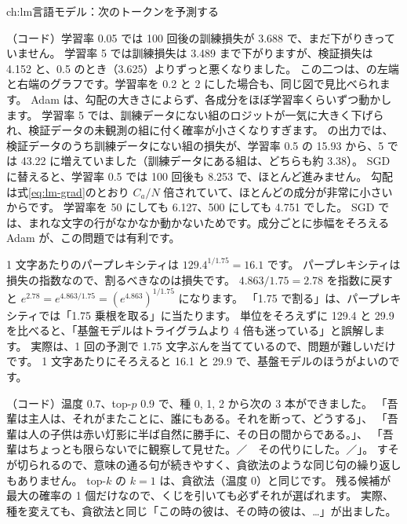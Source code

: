 \begin{answers}{ch:lm}{言語モデル：次のトークンを予測する}
\item （コード）学習率 0.05 では 100 回後の訓練損失が 3.688 で、まだ下がりきっていません。
学習率 5 では訓練損失は 3.489 まで下がりますが、検証損失は 4.152 と、0.5 のとき（3.625）よりずっと悪くなりました。
この二つは、の左端と右端のグラフです。学習率を 0.2 と 2 にした場合も、同じ図で見比べられます。
Adam は、勾配の大きさによらず、各成分をほぼ学習率くらいずつ動かします。
学習率 5 では、訓練データにない組のロジットが一気に大きく下げられ、検証データの未観測の組に付く確率が小さくなりすぎます。
 の出力では、検証データのうち訓練データにない組の損失が、学習率 0.5 の 15.93 から、5 では 43.22 に増えていました（訓練データにある組は、どちらも約 3.38）。
SGD に替えると、学習率 0.5 では 100 回後も 8.253 で、ほとんど進みません。
勾配は式\eqref{eq:lm-grad}のとおり $C_a/N$ 倍されていて、ほとんどの成分が非常に小さいからです。
学習率を 50 にしても 6.127、500 にしても 4.751 でした。
SGD では、まれな文字の行がなかなか動かないためです。成分ごとに歩幅をそろえる Adam が、この問題では有利です。

\item 1 文字あたりのパープレキシティは $129.4^{1/1.75}=16.1$ です。
パープレキシティは損失の指数なので、割るべきなのは損失です。
$4.863/1.75=2.78$ を指数に戻すと $e^{2.78}=e^{4.863/1.75}=(e^{4.863})^{1/1.75}$ になります。
「1.75 で割る」は、パープレキシティでは「1.75 乗根を取る」に当たります。
単位をそろえずに 129.4 と 29.9 を比べると、「基盤モデルはトライグラムより 4 倍も迷っている」と誤解します。
実際は、1 回の予測で 1.75 文字ぶんを当てているので、問題が難しいだけです。
1 文字あたりにそろえると 16.1 と 29.9 で、基盤モデルのほうがよいのです。

\item （コード）温度 0.7、top-$p$ 0.9 で、種 0, 1, 2 から次の 3 本ができました。
「吾輩は主人は、それがまたことに、誰にもある。それを断って、どうする」、
「吾輩は人の子供は赤い灯影に半ば自然に勝手に、その日の間からである。」、
「吾輩はちょっとも限らないでに観察して見せた。／　その代りにした。／」。
すそが切られるので、意味の通る句が続きやすく、貪欲法のような同じ句の繰り返しもありません。
top-$k$ の $k=1$ は、貪欲法（温度 0）と同じです。
残る候補が最大の確率の 1 個だけなので、くじを引いても必ずそれが選ばれます。
実際、種を変えても、貪欲法と同じ「この時の彼は、その時の彼は、\dots」が出ました。
\end{answers}
